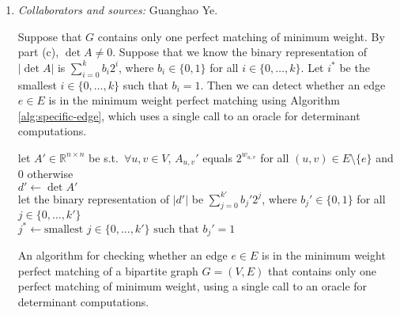 \documentclass[letterpaper, reqno,11pt]{article}
\newcommand{\RR}{\mathbb{R}}
\begin{document}
\begin{enumerate}
\begin{enumerate}
    \begin{proof}
      Consider $K_{2, 2}$, i.e., $L = R = [2]$ and $E = L \times R$. Let $w_{u, v} = 1$ for all $(u, v) \in E$. There are two perfect matchings of this graph, namely $\{ (1, 1), (2, 2) \}$ and $\{ (1, 2), (2, 1) \}$, both of weight $2$. Hence, the weights $w_{u, v}$ for $(u, v) \in E$ result in more than one perfect matching of minimum weight. Note that $A_{u, v} = X_{u, v} = 2^{w_{u, v}} = 2^1 = 2$ for all $(u, v) \in L \times R = E$. Therefore,
      $$ \det A = \det \begin{pmatrix}
        2 & 2 \\
        2 & 2
      \end{pmatrix} = 2 \cdot 2 - 2 \cdot 2 = 0. $$
      This shows that the property from part (c) does not hold, completing the proof.
    \end{proof}

    \clearpage

    \item \noindent\emph{Collaborators and sources:} Guanghao Ye.

    \bigskip

    Suppose that $G$ contains only one perfect matching of minimum weight. By part (c), $\det A \neq 0$. Suppose that we know the binary representation of $|\det A|$ is $\sum_{i = 0}^k b_i 2^i$, where $b_i \in \{ 0, 1 \}$ for all $i \in \{ 0, \ldots, k \}$. Let $i^*$ be the smallest $i \in \{ 0, \ldots, k \}$ such that $b_i = 1$. Then we can detect whether an edge $e \in E$ is in the minimum weight perfect matching using Algorithm \ref{alg:specific-edge}, which uses a single call to an oracle for determinant computations.

    \begin{algorithm}
      let $A' \in \RR^{n \times n}$ be s.t.\ $\forall u, v \in V$, $A_{u, v}'$ equals $2^{w_{u, v}}$ for all $(u, v) \in E \setminus \{ e \}$ and $0$ otherwise \\
      $d' \leftarrow \det A'$ \\
      let the binary representation of $|d'|$ be $\sum_{j = 0}^{k'} b_j' 2^j$, where $b_j' \in \{ 0, 1 \}$ for all $j \in \{ 0, \ldots, k' \}$ \\
      $j^* \leftarrow \text{smallest $j \in \{ 0, \ldots, k' \}$ such that $b_j' = 1$}$ \\
      \caption{An algorithm for checking whether an edge $e \in E$ is in the minimum weight perfect matching of a bipartite graph $G = (V, E)$ that contains only one perfect matching of minimum weight, using a single call to an oracle for determinant computations.}
      \label{alg:specific-edge}
    \end{algorithm}


\end{enumerate}
\end{enumerate}
\end{document}
